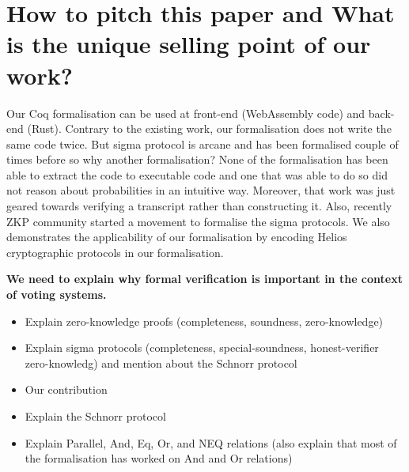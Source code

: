 \documentclass[conference,compsoc]{IEEEtran}
\begin{document}
\section{How to pitch this paper and What is the unique selling point of our work?}
Our Coq formalisation can be used at front-end (WebAssembly code) and 
back-end (Rust). Contrary to the existing work, our formalisation
does not write the same code twice. But sigma protocol is arcane and has 
been formalised couple of times before so why another formalisation?
None of the formalisation has been able to extract the code to executable code 
and one that was able to do so did not reason about probabilities in an intuitive way.
Moreover, that work was just geared towards verifying a transcript rather than
constructing it. Also, recently ZKP community started a movement to 
formalise the sigma protocols. We also demonstrates the 
applicability of our formalisation by encoding Helios cryptographic protocols
in our formalisation. 



\textbf{We need to explain why formal verification is important in the context of voting systems.}

\begin{itemize}
  \item Explain zero-knowledge proofs (completeness, soundness, zero-knowledge)
  \item Explain sigma protocols (completeness, special-soundness, honest-verifier zero-knowledg) 
  and mention about the Schnorr protocol
  \item Our contribution
  \item Explain the Schnorr protocol
  \item Explain Parallel, And, Eq, Or, and NEQ relations (also explain that 
  most of the formalisation has worked on And and Or relations)
\end{itemize}

\fi
\end{document}
